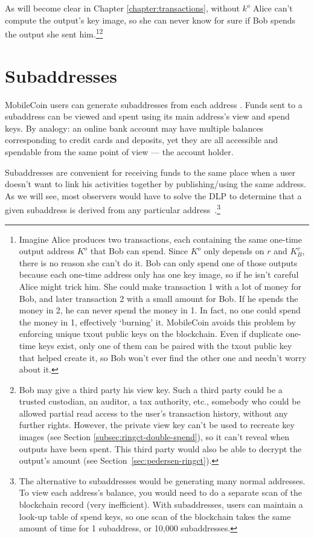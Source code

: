 As will become clear in Chapter \ref{chapter:transactions}, without $k^o$ Alice can't compute the output's key image, so she can never know for sure if Bob spends the output she sent him.\footnote{Imagine Alice produces two transactions, each containing the same one-time output address $K^o$ that Bob can spend. Since $K^o$ only depends on $r$ and $K_B^v$, there is no reason she can't do it. Bob can only spend one of those outputs because each one-time address only has one key image, so if he isn't careful Alice might trick him. She could make transaction 1 with a lot of money for Bob, and later transaction 2 with a small amount for Bob. If he spends the money in 2, he can never spend the money in 1. In fact, no one could spend the money in 1, effectively `burning' it. MobileCoin avoids this problem by enforcing unique txout public keys on the blockchain. Even if duplicate one-time keys exist, only one of them can be paired with the txout public key that helped create it, so Bob won't ever find the other one and needn't worry about it.}\footnote{Bob may give a third party his view key. Such a third party could be a trusted custodian, an auditor, a tax authority, etc., somebody who could be allowed partial read access to the user’s transaction history, without any further rights. However, the private view key can't be used to recreate key images (see Section \ref{subsec:ringct-double-spend}), so it can't reveal when outputs have been spent. This third party would also be able to decrypt the output's amount (see Section~\ref{sec:pedersen-ringct}).} %



\section{Subaddresses}
\label{sec:subaddresses}

MobileCoin users can generate subaddresses from each address \cite{MRL-0006-subaddresses}. Funds sent to a subaddress can be viewed and spent using its main address’s view and spend keys. By analogy: an online bank account may have multiple balances corresponding to credit cards and deposits, yet they are all accessible and spendable from the same point of view --- the account holder.

Subaddresses are convenient for receiving funds to the same place when a user doesn't want to link his activities together by publishing/using the same address. As we will see, most observers would have to solve the DLP to determine that a given subaddress is derived from any particular address~\cite{MRL-0006-subaddresses}.\footnote{The alternative to subaddresses would be generating many normal addresses. To view each address's balance, you would need to do a separate scan of the blockchain record (very inefficient). With subaddresses, users can maintain a look-up table of spend keys, so one scan of the blockchain takes the same amount of time for 1 subaddress, or 10,000 subaddresses.}

